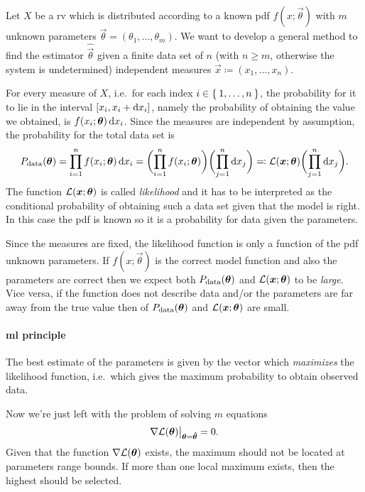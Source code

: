 Let $X$ be a \ac{rv} which is distributed according to a known \ac{pdf} $f(x;\vec{\theta})$ with $m$ unknown parameters $\vec{\theta} = (\theta_1,\dots,\theta_m)$.
We want to develop a general method to find the estimator $\hat{\vec{\theta}}$ given a finite data set of $n$ (with $n\ge m$, otherwise the system is undetermined) independent measures $\vec{x}\coloneqq (x_1,\dots,x_n)$.


For every measure of $X$, i.e.~for each index $i \in\Set{1,\dots,n}$, the probability for it to lie in the interval $[x_i,x_i+\ud x_i]$, namely the probability of obtaining the value we obtained, is $f(x_i;\vec{\theta})\ud x_i$.
Since the measures are independent by assumption, the probability for the total data set is
\begin{equation}
	P_\textup{data}(\vec{\theta})
	= \prod_{i=1}^n f(x_i;\vec{\theta})\ud x_i
	=\biggl(\prod_{i=1}^n f(x_i;\vec{\theta}) \biggr)\biggl(\prod_{j=1}^n \ud x_j\biggr)
	\eqqcolon \lkhd(\vec{x};\vec{\theta})\biggl(\prod_{j=1}^n \ud x_j\biggr).
\end{equation}
The function $\lkhd(\vec{x};\vec{\theta})$ is called \emph{likelihood} and it has to be interpreted as the conditional probability of obtaining such a data set given that the model is right.
In this case the \ac{pdf} is known so it is a probability for data given the parameters.


Since the measures are fixed, the likelihood function is only a function of the \ac{pdf} unknown parameters.
If $f(x;\vec{\theta})$ is the correct model function and also the parameters are correct then we expect both $P_\textup{data}(\vec{\theta})$ and $\lkhd(\vec{x};\vec{\theta})$ to be \emph{large}.
Vice versa, if the function does not describe data and/or the parameters are far away from the true value then of $P_\textup{data}(\vec{\theta})$ and $\lkhd(\vec{x};\vec{\theta})$ are small.



\paragraph{\acl{ml} principle}
The best estimate of the parameters \vec{\theta} is given by the vector \vec{\hat\theta} which \emph{maximizes} the likelihood function, i.e.~which gives the maximum probability to obtain observed data.


Now we're just left with the problem of solving $m$ equations
\begin{equation}
	\V\lkhd(\vec{\theta})\big\lvert_{\vec{\theta} = \vec{\hat\theta}} = 0.
\end{equation}
Given that the function $\V\lkhd(\vec{\theta})$ exists, the maximum should not be located at parameters range bounds.
If more than one local maximum exists, then the highest should be selected.




